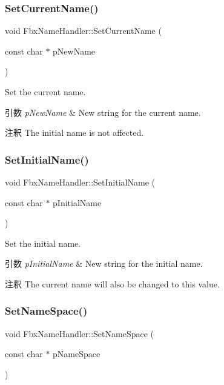 \subsubsection{\texorpdfstring{Set\+Current\+Name()}{SetCurrentName()}}
{\footnotesize\ttfamily void Fbx\+Name\+Handler\+::\+Set\+Current\+Name (\begin{DoxyParamCaption}\item[{const char $\ast$}]{p\+New\+Name }\end{DoxyParamCaption})}

Set the current name. 
\begin{DoxyParams}{引数}
{\em p\+New\+Name} & New string for the current name. \\
\hline
\end{DoxyParams}
\begin{DoxyRemark}{注釈}
The initial name is not affected. 
\end{DoxyRemark}
\mbox{\label{class_fbx_name_handler_a6504ca871810d1a93f38fa60b9841a3f}} 
\subsubsection{\texorpdfstring{Set\+Initial\+Name()}{SetInitialName()}}
{\footnotesize\ttfamily void Fbx\+Name\+Handler\+::\+Set\+Initial\+Name (\begin{DoxyParamCaption}\item[{const char $\ast$}]{p\+Initial\+Name }\end{DoxyParamCaption})}

Set the initial name. 
\begin{DoxyParams}{引数}
{\em p\+Initial\+Name} & New string for the initial name. \\
\hline
\end{DoxyParams}
\begin{DoxyRemark}{注釈}
The current name will also be changed to this value. 
\end{DoxyRemark}
\mbox{\label{class_fbx_name_handler_ac70bc1016ef7888fc736ab42e50857a7}} 
\subsubsection{\texorpdfstring{Set\+Name\+Space()}{SetNameSpace()}}
{\footnotesize\ttfamily void Fbx\+Name\+Handler\+::\+Set\+Name\+Space (\begin{DoxyParamCaption}\item[{const char $\ast$}]{p\+Name\+Space }\end{DoxyParamCaption})}

